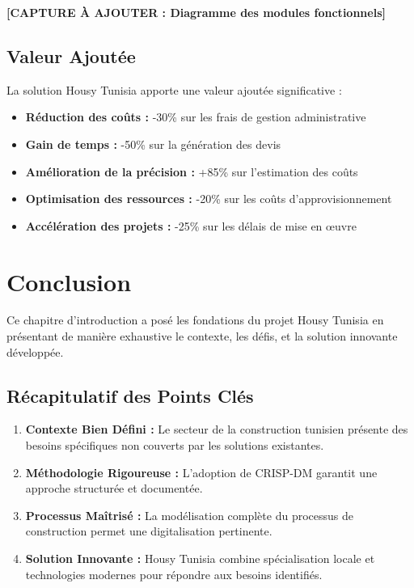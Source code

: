 \textbf{[CAPTURE À AJOUTER : Diagramme des modules fonctionnels]}

\subsection{Valeur Ajoutée}

La solution Housy Tunisia apporte une valeur ajoutée significative :

\begin{itemize}
    \item \textbf{Réduction des coûts :} -30\% sur les frais de gestion administrative
    \item \textbf{Gain de temps :} -50\% sur la génération des devis
    \item \textbf{Amélioration de la précision :} +85\% sur l'estimation des coûts
    \item \textbf{Optimisation des ressources :} -20\% sur les coûts d'approvisionnement
    \item \textbf{Accélération des projets :} -25\% sur les délais de mise en œuvre
\end{itemize}

\section{Conclusion}

Ce chapitre d'introduction a posé les fondations du projet Housy Tunisia en présentant de manière exhaustive le contexte, les défis, et la solution innovante développée.

\subsection{Récapitulatif des Points Clés}

\begin{enumerate}
    \item \textbf{Contexte Bien Défini :} Le secteur de la construction tunisien présente des besoins spécifiques non couverts par les solutions existantes.
    
    \item \textbf{Méthodologie Rigoureuse :} L'adoption de CRISP-DM garantit une approche structurée et documentée.
    
    \item \textbf{Processus Maîtrisé :} La modélisation complète du processus de construction permet une digitalisation pertinente.
    
    \item \textbf{Solution Innovante :} Housy Tunisia combine spécialisation locale et technologies modernes pour répondre aux besoins identifiés.
\end{enumerate}

